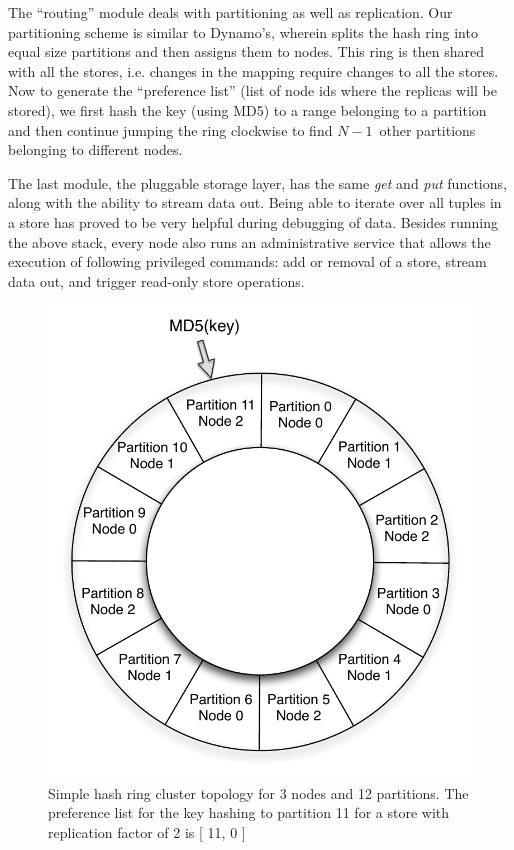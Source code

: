 The ``routing'' module deals with partitioning as well as replication.
Our partitioning scheme is similar to Dynamo's, wherein
\projectname{} splits the hash ring into equal size partitions and
then assigns them to nodes. This ring is then shared with all the
stores, i.e. changes in the mapping require changes to all the stores.
Now to generate the ``preference list'' (list of node ids where the
replicas will be stored), we first hash the key (using MD5) to a range belonging
to a partition and then continue jumping the ring clockwise to find
$N{-}1$~other partitions belonging to different nodes. 

The last module, the pluggable storage layer, has the same \emph{get}
and \emph{put} functions, along with the ability to stream data out.
Being able to iterate over all tuples in a store has proved to be very
helpful during debugging of data. Besides running the above stack,
every node also runs an administrative service that allows the execution 
of following privileged commands: add or removal of a store, stream data out,
and trigger read-only store operations. 

\begin{figure}
  \centering
    \includegraphics[scale=0.40]{images/hash.pdf}
  \caption{Simple hash ring cluster topology for 3 nodes and 12 partitions. The preference list for the key hashing to partition 11 for a store with replication factor of 2 is [ 11, 0 ]}
  \label{hash}
\end{figure}


